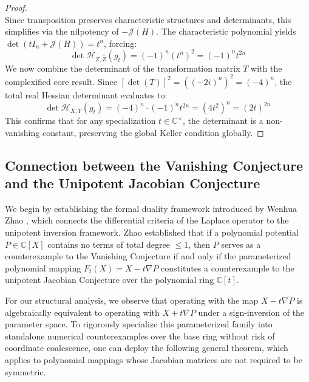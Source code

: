 \documentclass[11pt,a4paper]{article}
\begin{document}
\begin{proof}
\begin{equation}
\end{equation}
Since transposition preserves characteristic structures and determinants, this simplifies via the nilpotency of $-\mathcal{J}(H)$. The characteristic polynomial yields $\det(t I_n + \mathcal{J}(H)) = t^n$, forcing:
\begin{equation}
\det \mathcal{H}_{Z,\bar{Z}}(g_t) = (-1)^n (t^n)^2 = (-1)^n t^{2n}
\end{equation}
We now combine the determinant of the transformation matrix $T$ with the complexified core result. Since $\left[ \det(T) \right]^2 = \left( (-2i)^n \right)^2 = (-4)^n$, the total real Hessian determinant evaluates to:
\begin{equation}
\det \mathcal{H}_{X,Y}(g_t) = (-4)^n \cdot (-1)^n t^{2n} = (4t^2)^n = (2t)^{2n}
\end{equation}
This confirms that for any specialization $t \in \mathbb{C}^\times$, the determinant is a non-vanishing constant, preserving the global Keller condition globally.
\end{proof}

\subsection{Connection between the Vanishing Conjecture and the Unipotent Jacobian Conjecture}
\label{subsec:vanishing_ujc_connection}

We begin by establishing the formal duality framework introduced by Wenhua Zhao \cite{zhao2007}, which connects the differential criteria of the Laplace operator to the unipotent inversion framework. Zhao established that if a polynomial potential $P \in \mathbb{C}[X]$ contains no terms of total degree $\le 1$, then $P$ serves as a counterexample to the Vanishing Conjecture if and only if the parameterized polynomial mapping $F_t(X) = X - t \nabla P$ constitutes a counterexample to the unipotent Jacobian Conjecture over the polynomial ring $\mathbb{C}[t]$. 

For our structural analysis, we observe that operating with the map $X - t \nabla P$ is algebraically equivalent to operating with $X + t \nabla P$ under a sign-inversion of the parameter space. To rigorously specialize this parameterized family into standalone numerical counterexamples over the base ring without risk of coordinate coalescence, one can deploy the following general theorem, which applies to polynomial mappings whose Jacobian matrices are not required to be symmetric.
\end{document}
